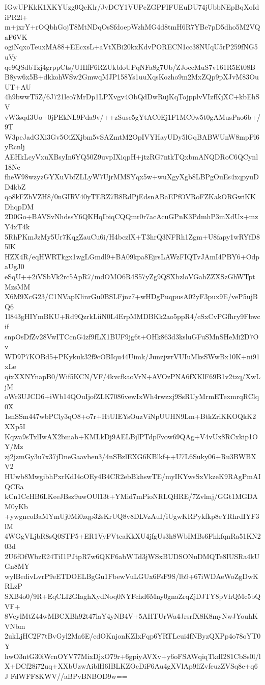 IGwUPKkK1XKYUzg0QcKlr/JvDCY1VUPcZGPFIFUEuDU74jUbbNEpBqXoIdiPR2l+
m+jxrY+rOQbhGojT8MtNDqOsSfdoepWzhMG4d8tmH6R7YBe7pD5dho5M2VQaF6VK
ogiNqxoTeuxMA88+EEcxsL+aVtXBi20kxKdvPORECN1cc38NUqU5rP259fNG5uVy
qe9QSdbTzj4grppCts/UHlfF6RZUkbloUPqNFa8g7Ub/ZJoccMuS7v161R5Et08B
B8yw6x5B+dkkohWSw2GmwqMJP158Ys1uuXqsKozho9m2MxZQp9pXJvM83OuUT+AU
4h9bwwT5Z/6J721leo7MrDp1LPXvgv4ObQdDwRujKqTojpplvVIzfKjXC+kbEhSV
vW3sqd3Uo+0jPEkNL9Pda9v/++zSuse5gYtAC0Ej1F1MC0w5t0gAMusPao6b+/9T
W3peJadGXi3Gv5OiZXjbm5vSAZmtM2OpIVYHayUDy5lGqBABWUnW8mpPl6yRcnlj
AEHkLcyVxuXBsyIn6YQ50Z9uvpIXiqpH+jtzRG7ntkTQxbmANQDRoC6QCynl18Ne
fheW98wzyzGYXuVbfZLLyW7UjrMMSYqx5w+wuXgyXgb8LBPgOuEs4xqpyuDD4kbZ
qo8kFZbVZH8/0nGIRV40yTERZ7B8RdPjEdsnABaEPfOVRoFZKakORGwiKKDhqpDM
2D0Go+BAVSvNhdssY6QKHqIbiqCQQmr0r7acAcuGPnK3PdmhP3mXdUx+mzY4xT4k
5RhPKmJzMy5Ur7KqgZauCu6i/H4bczlX+T3hrQ3NFRh1Zgm+U8fapy1wRYfD85lK
HZX4R/eqHWRTkgx1wgLGmdl9+BA09kpa8EjrsLAWzFIQTvJAmI4PBY6+OdpaUgJ0
eSqU++2iVSbVk2rc5ApR7/mdOMO6R4S57yZg9QSXbzloVGabZZXSzGhWTptMzsMM
X6M9XcG23/C1NVapKlinrGu0BSLFjnz7+wHDgPuqpusA02yF3pux9E/veP5ujBQ6
1l843gHIYmBKU+Rd9QzrkLiiN0L4ErpMMDBKk2ao5ppR4/cSxCvPGfhry9Fbwcif
snpOsDfZv28VwITCcnG4zf9fLX1BUF9jg6t+OHk863d3ksluGFuSMnSHeMi2D7Ov
WD9P7KOBd5+PKykuk32f9cOBIqu44Uimk/JunzjwrVUIuMksSWwBx10K+ni91xLe
qixXXNYnapB0/Wif5KCN/VF/4kvcfkaoVrN+AVOzPNA6fXKlF69B1v2tzq/XwLjM
oWr3UJCD6+iWb14QOuIjofZLK7086vewIxWh4rwzxj9SsRUyMrmETexmrqRClq0X
1snSSm447wbPCly3qO8+o7r+HtUIEYsOuzViNpUUHN9Lm+BtkZriKKOQkK2XXp5I
Kqwa9sTxlIwAX2bmab+KMLkDj9AELBjlPTdpFvow69QAg+V4vUx8RCxkip1OY/Mz
zj2jzmGy3u7x37jDneGaavbeu3/4nSBzlEXG6KBlkf++U7L6Suky06+Ru3BWBXV2
HUwb8MwgibhPxrKdI4oOEy4B4CR2ebBkhswTE/myIKYwsSxVkzeK9RAgPmAIQCEa
kCn1CcHB6LKeeJBsz9uwOUl13t+YMid7mPioNRLQHRE/7Zvlmj/GGt1MGDAM0yKb
+ywgncoBaMYmUj0Mi0zqp32sKrUQ8v8DLVzAuI/iUgwKRPykfkp8eYRhrdIYF3lM
4WGgVLjbR8sQ0STP5+ER1VyFVtcaKkXU4jfgUs3h8WbIMBs6FhkfqnRa51KN203d
2U6fOfWbzE24TiI1PJtpR7w6QKF6abWTd3jWSxBUDSONuDMQTe8IUSRa4kUGn8MY
wylBedivLvrP9eETDOELBgGu1FbewVuLGUx6FsF9S/lb9+67iWDAeWoZgDwKRLzP
SXB4o0/9R+EqCLI2GIaghXydNoq0NYFchd6Mny0gnaZrqZjDJTY8pVhQMc5bQVF+
8VeylMtZ44wMBCXBh92t47laY4yNB4V+5AHTUrWa4JrsrfX8K8myNwJYouhKVNbm
2ukLjHC2F7tBvGyl2Ma6E/edOKnjonKZIxFqp6YRTLeui4fNByzQXPp4o78oYT0Y
hwO3ntG30iWcnOYV77MixDjxO79r+6gpiyAVXv+y6oFSAWqiqTkdI281CbSs0l/l
X+DCf28i72uq+XXbUzwAiblH6IBLKZOcDiF6Au4gXVlAp9fiZvfeuzZVSq8e+q6J
FdWFF8KWV//aBPvBNBOD9w==
